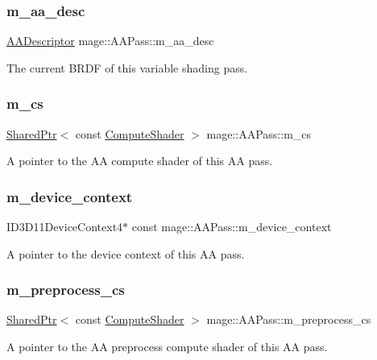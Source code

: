 \subsubsection{\texorpdfstring{m\+\_\+aa\+\_\+desc}{m\_aa\_desc}}
{\footnotesize\ttfamily \hyperlink{namespacemage_a86cd40b8f2f42ca4d616cc6ec665a7f2}{A\+A\+Descriptor} mage\+::\+A\+A\+Pass\+::m\+\_\+aa\+\_\+desc\hspace{0.3cm}{\ttfamily [private]}}

The current B\+R\+DF of this variable shading pass. \hypertarget{classmage_1_1_a_a_pass_aca04ca410ab5c0d1cd4270f2c7ccfe1c}{}\label{classmage_1_1_a_a_pass_aca04ca410ab5c0d1cd4270f2c7ccfe1c} 
\subsubsection{\texorpdfstring{m\+\_\+cs}{m\_cs}}
{\footnotesize\ttfamily \hyperlink{namespacemage_a1e01ae66713838a7a67d30e44c67703e}{Shared\+Ptr}$<$ const \hyperlink{namespacemage_ae040329401484b076f0cd1a7c43d19c9}{Compute\+Shader} $>$ mage\+::\+A\+A\+Pass\+::m\+\_\+cs\hspace{0.3cm}{\ttfamily [private]}}

A pointer to the AA compute shader of this AA pass. \hypertarget{classmage_1_1_a_a_pass_ae5a0a1323cfbb03adeb444e2972c7159}{}\label{classmage_1_1_a_a_pass_ae5a0a1323cfbb03adeb444e2972c7159} 
\subsubsection{\texorpdfstring{m\+\_\+device\+\_\+context}{m\_device\_context}}
{\footnotesize\ttfamily I\+D3\+D11\+Device\+Context4$\ast$ const mage\+::\+A\+A\+Pass\+::m\+\_\+device\+\_\+context\hspace{0.3cm}{\ttfamily [private]}}

A pointer to the device context of this AA pass. \hypertarget{classmage_1_1_a_a_pass_a9b8a50f0e4b21ae3f558cb010acfa3b1}{}\label{classmage_1_1_a_a_pass_a9b8a50f0e4b21ae3f558cb010acfa3b1} 
\subsubsection{\texorpdfstring{m\+\_\+preprocess\+\_\+cs}{m\_preprocess\_cs}}
{\footnotesize\ttfamily \hyperlink{namespacemage_a1e01ae66713838a7a67d30e44c67703e}{Shared\+Ptr}$<$ const \hyperlink{namespacemage_ae040329401484b076f0cd1a7c43d19c9}{Compute\+Shader} $>$ mage\+::\+A\+A\+Pass\+::m\+\_\+preprocess\+\_\+cs\hspace{0.3cm}{\ttfamily [private]}}

A pointer to the AA preprocess compute shader of this AA pass. 